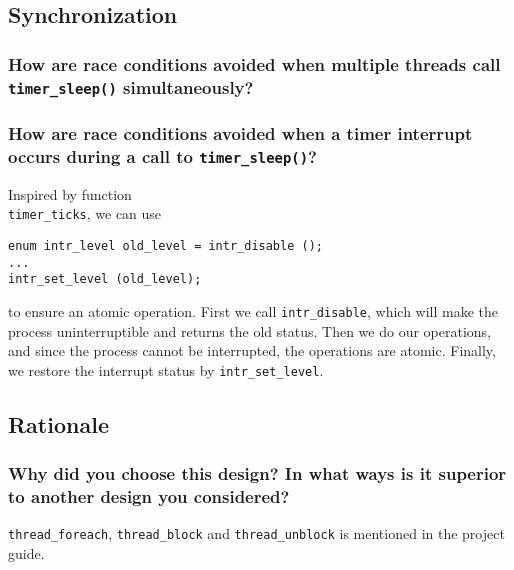 \documentclass[sigconf, nonacm]{acmart}
\begin{document}
        \subsection{Synchronization}
        
            \subsubsection{How are race conditions avoided when multiple threads call \texttt{timer\_sleep()} simultaneously? }
            
            \subsubsection{How are race conditions avoided when a timer interrupt occurs during a call to \texttt{timer\_sleep()}? }
            Inspired by function \\\texttt{timer\_ticks}, we can use 
            \begin{verbatim}
enum intr_level old_level = intr_disable ();
...
intr_set_level (old_level);\end{verbatim}
            to ensure an atomic operation. First we call \texttt{intr\_disable}, which will make the process uninterruptible and returns the old status. Then we do our operations, and since the process cannot be interrupted, the operations are atomic. Finally, we restore the interrupt status by \texttt{intr\_set\_level}. 
        
        \subsection{Rationale}
            
            \subsubsection{Why did you choose this design? In what ways is it superior to another design you considered? }
                \texttt{thread\_foreach}, \texttt{thread\_block} and \texttt{thread\_unblock} is mentioned in the project guide. 
\end{document}
